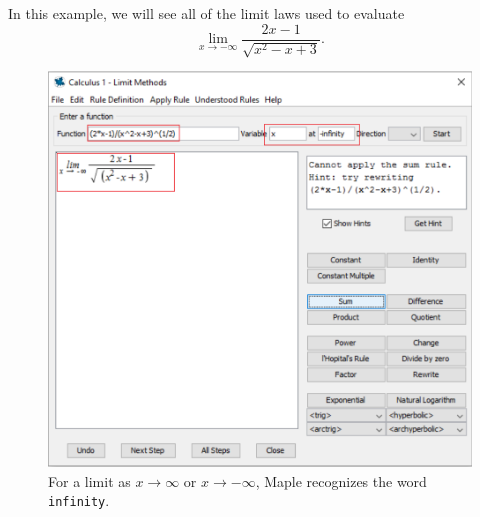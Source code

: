 In this example, we will see all of the limit laws used to evaluate \[ \displaystyle\lim_{x \rightarrow -\infty} \frac{2x-1}{\sqrt{x^2-x+3}}. \]

\begin{figure}[h]
\caption{For a limit as $x \rightarrow \infty$ or $x \rightarrow -\infty$, Maple recognizes the word \texttt{infinity}.}
\centering
\includegraphics[width=\textwidth]{tutorials/figures/LimitTutorQ2-1-eps-converted-to.pdf}
\end{figure}

